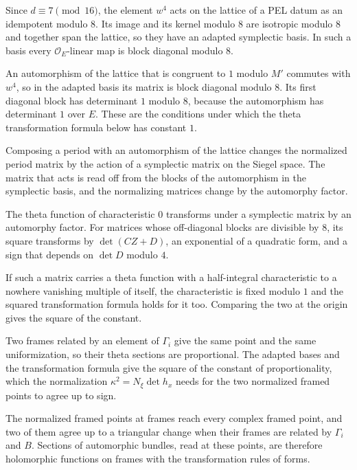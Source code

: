 Since $d\equiv7\pmod{16}$, the element $w^4$ acts on the lattice of a PEL datum as an idempotent modulo
$8$. Its image and its kernel modulo $8$ are isotropic modulo $8$ and together span the lattice, so they
have an adapted symplectic basis. In such a basis every $\mathcal O_E$-linear map is block diagonal
modulo $8$.

An automorphism of the lattice that is congruent to $1$ modulo $M'$ commutes with $w^4$, so in the
adapted basis its matrix is block diagonal modulo $8$. Its first diagonal block has determinant $1$
modulo $8$, because the automorphism has determinant $1$ over $E$. These are the conditions under which
the theta transformation formula below has constant $1$.

Composing a period with an automorphism of the lattice changes the normalized period matrix by the action
of a symplectic matrix on the Siegel space. The matrix that acts is read off from the blocks of the
automorphism in the symplectic basis, and the normalizing matrices change by the automorphy factor.

The theta function of characteristic $0$ transforms under a symplectic matrix by an automorphy factor.
For matrices whose off-diagonal blocks are divisible by $8$, its square transforms by $\det(CZ+D)$, an
exponential of a quadratic form, and a sign that depends on $\det D$ modulo $4$.

If such a matrix carries a theta function with a half-integral characteristic to a nowhere vanishing
multiple of itself, the characteristic is fixed modulo $1$ and the squared transformation formula holds
for it too. Comparing the two at the origin gives the square of the constant.

Two frames related by an element of $\Gamma_i$ give the same point and the same uniformization, so their
theta sections are proportional. The adapted bases and the transformation formula give the square of
the constant of proportionality, which the normalization $\kappa^2=N_\xi\det h_x$ needs for the two
normalized framed points to agree up to sign.

The normalized framed points at frames reach every complex framed point, and two of them agree up to a
triangular change when their frames are related by $\Gamma_i$ and $B$. Sections of automorphic bundles,
read at these points, are therefore holomorphic functions on frames with the transformation rules of
forms.

